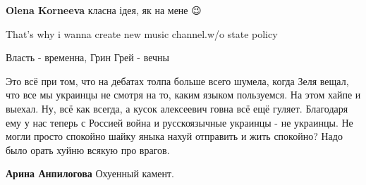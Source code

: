 \begin{itemize}
\begin{itemize}
 
\textbf{Olena Korneeva} класна ідея, як на мене 😉
\end{itemize}

 
That's why i wanna create new music channel.w/o state policy

 
Власть - временна, Грин Грей - вечны

 

Это всё при том, что на дебатах толпа больше всего шумела, когда Зеля вещал,
что все мы украинцы не смотря на то, каким языком пользуемся. На этом хайпе и
выехал. Ну, всё как всегда, а кусок алексеевич говна всё ещё гуляет. Благодаря
ему у нас теперь с Россией война и русскоязычные украинцы - не украинцы. Не
могли просто спокойно шайку яныка нахуй отправить и жить спокойно? Надо было
орать хуйню всякую про врагов.

\begin{itemize}
 
\textbf{Арина Анпилогова}
Охуенный камент.

 

\end{itemize}
\end{itemize}
